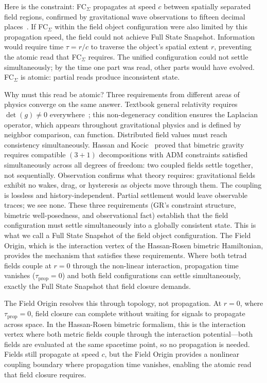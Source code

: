 \documentclass[aps,prd,preprint,superscriptaddress,showpacs,preprintnumbers,amsmath,amssymb,nofootinbib]{revtex4-2}
\begin{document}
Here is the constraint: FC$_{\Sigma}$ propagates at speed $c$ between spatially separated field regions, confirmed by gravitational wave observations to fifteen decimal places~\cite{gw170817}. If FC$_{\Sigma}$ within the field object configuration were also limited by this propagation speed, the field could not achieve Full State Snapshot. Information would require time $\tau = r/c$ to traverse the object's spatial extent $r$, preventing the atomic read that FC$_{\Sigma}$ requires. The unified configuration could not settle simultaneously; by the time one part was read, other parts would have evolved. FC$_{\Sigma}$ is atomic: partial reads produce inconsistent state.

Why must this read be atomic? Three requirements from different areas of physics converge on the same answer. Textbook general relativity requires $\det(g) \neq 0$ everywhere~\cite{mtw1973,wald1984}; this non-degeneracy condition ensures the Laplacian operator, which appears throughout gravitational physics and is defined by neighbor comparison, can function. Distributed field values must reach consistency simultaneously. Hassan and Kocic~\cite{hassankocic2018} proved that bimetric gravity requires compatible $(3{+}1)$ decompositions with ADM constraints satisfied simultaneously across all degrees of freedom: two coupled fields settle together, not sequentially. Observation confirms what theory requires: gravitational fields exhibit no wakes, drag, or hysteresis as objects move through them. The coupling is lossless and history-independent. Partial settlement would leave observable traces; we see none. These three requirements (GR's constraint structure, bimetric well-posedness, and observational fact) establish that the field configuration must settle simultaneously into a globally consistent state. This is what we call a Full State Snapshot of the field object configuration. The Field Origin, which is the interaction vertex of the Hassan-Rosen bimetric Hamiltonian, provides the mechanism that satisfies these requirements. Where both tetrad fields couple at $r = 0$ through the non-linear interaction, propagation time vanishes ($\tau_{\text{prop}} = 0$) and both field configurations can settle simultaneously, exactly the Full State Snapshot that field closure demands.

The Field Origin resolves this through topology, not propagation. At $r = 0$, where $\tau_{\text{prop}} = 0$, field closure can complete without waiting for signals to propagate across space. In the Hassan-Rosen bimetric formalism, this is the interaction vertex where both metric fields couple through the interaction potential---both fields are evaluated at the same spacetime point, so no propagation is needed. Fields still propagate at speed $c$, but the Field Origin provides a nonlinear coupling boundary where propagation time vanishes, enabling the atomic read that field closure requires.
\end{document}
